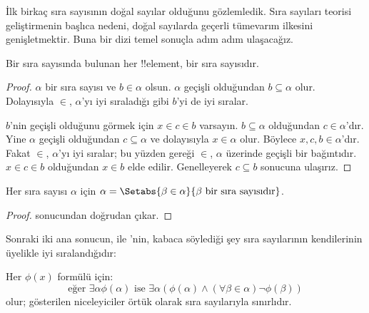 \documentclass[../../../include/open-logic-section]{subfiles}
\begin{document}

İlk birkaç sıra sayısının doğal sayılar olduğunu gözlemledik. Sıra sayıları
teorisi geliştirmenin başlıca nedeni, doğal sayılarda geçerli tümevarım
ilkesini genişletmektir. Buna bir dizi temel sonuçla adım adım ulaşacağız.

\begin{lem}
Bir sıra sayısında bulunan her !!{element}, bir sıra sayısıdır.
\end{lem}

\begin{proof}
$\alpha$ bir sıra sayısı ve $b\in\alpha$ olsun. $\alpha$ geçişli olduğundan
$b\subseteq\alpha$ olur. Dolayısıyla $\in$, $\alpha$'yı iyi sıraladığı gibi
$b$'yi de iyi sıralar.

$b$'nin geçişli olduğunu görmek için $x\in c\in b$ varsayın.
$b\subseteq\alpha$ olduğundan $c\in\alpha$'dır. Yine $\alpha$ geçişli
olduğundan $c\subseteq\alpha$ ve dolayısıyla $x\in\alpha$ olur. Böylece
$x,c,b\in\alpha$'dır. Fakat $\in$, $\alpha$'yı iyi sıralar; bu yüzden
 gereği $\in$, $\alpha$ üzerinde
geçişli bir bağıntıdır. $x\in c\in b$ olduğundan $x\in b$ elde edilir.
Genelleyerek $c\subseteq b$ sonucuna ulaşırız.
\end{proof}

\begin{cor}
Her sıra sayısı $\alpha$ için
$\alpha=\Setabs{\beta\in\alpha}{\beta\text{ bir sıra sayısıdır}}$.
\end{cor}

\begin{proof}
 sonucundan doğrudan çıkar.
\end{proof}

Sonraki iki ana sonucun,  ile
'nin, kabaca söylediği şey sıra sayılarının
kendilerinin üyelikle iyi sıralandığıdır:

\begin{thm}
Her $\phi(x)$ formülü için:
\[
	\text{eğer }\exists \alpha \phi(\alpha)\text{ ise }\exists \alpha(\phi(\alpha)
	\land  (\forall \beta \in \alpha) \lnot \phi(\beta))
\]
olur; gösterilen niceleyiciler örtük olarak sıra sayılarıyla sınırlıdır.
\end{thm}
\end{document}
